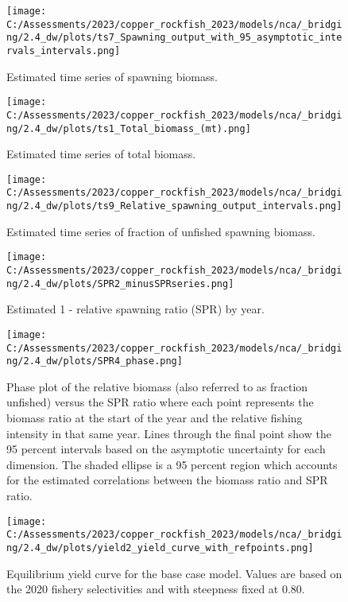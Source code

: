 \documentclass[11pt,
  english,
  letterpaper,
]{article}
\begin{document}
\begin{figure}
\centering
\texttt{[image: C:/Assessments/2023/copper\_rockfish\_2023/models/nca/\_bridging/2.4\_dw/plots/ts7\_Spawning\_output\_with\_95\_asymptotic\_intervals\_intervals.png]}
\caption{Estimated time series of spawning biomass.\label{fig:ssb}}
\end{figure}

\begin{figure}
\centering
\texttt{[image: C:/Assessments/2023/copper\_rockfish\_2023/models/nca/\_bridging/2.4\_dw/plots/ts1\_Total\_biomass\_(mt).png]}
\caption{Estimated time series of total biomass.\label{fig:tot-bio}}
\end{figure}

\begin{figure}
\centering
\texttt{[image: C:/Assessments/2023/copper\_rockfish\_2023/models/nca/\_bridging/2.4\_dw/plots/ts9\_Relative\_spawning\_output\_intervals.png]}
\caption{Estimated time series of fraction of unfished spawning biomass.\label{fig:depl}}
\end{figure}

\begin{figure}
\centering
\texttt{[image: C:/Assessments/2023/copper\_rockfish\_2023/models/nca/\_bridging/2.4\_dw/plots/SPR2\_minusSPRseries.png]}
\caption{Estimated 1 - relative spawning ratio (SPR) by year.\label{fig:1-spr}}
\end{figure}

\clearpage

\begin{figure}
\centering
\texttt{[image: C:/Assessments/2023/copper\_rockfish\_2023/models/nca/\_bridging/2.4\_dw/plots/SPR4\_phase.png]}
\caption{Phase plot of the relative biomass (also referred to as fraction unfished) versus the SPR ratio where each point represents the biomass ratio at the start of the year and the relative fishing intensity in that same year. Lines through the final point show the 95 percent intervals based on the asymptotic uncertainty for each dimension. The shaded ellipse is a 95 percent region which accounts for the estimated correlations between the biomass ratio and SPR ratio.\label{fig:phase}}
\end{figure}

\begin{figure}
\centering
\texttt{[image: C:/Assessments/2023/copper\_rockfish\_2023/models/nca/\_bridging/2.4\_dw/plots/yield2\_yield\_curve\_with\_refpoints.png]}
\caption{Equilibrium yield curve for the base case model. Values are based on the 2020 fishery selectivities and with steepness fixed at 0.80.\label{fig:yield}}
\end{figure}
\end{document}
